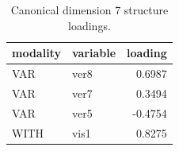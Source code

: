 \begin{table}
\caption{Canonical dimension 7 structure loadings.}
\label{tab:cca_dimension_7_loadings}
\begin{tabular}{llr}
\toprule
modality & variable & loading \\
\midrule
VAR & ver8 & 0.6987 \\
VAR & ver7 & 0.3494 \\
VAR & ver5 & -0.4754 \\
WITH & vis1 & 0.8275 \\
\bottomrule
\end{tabular}
\end{table}
